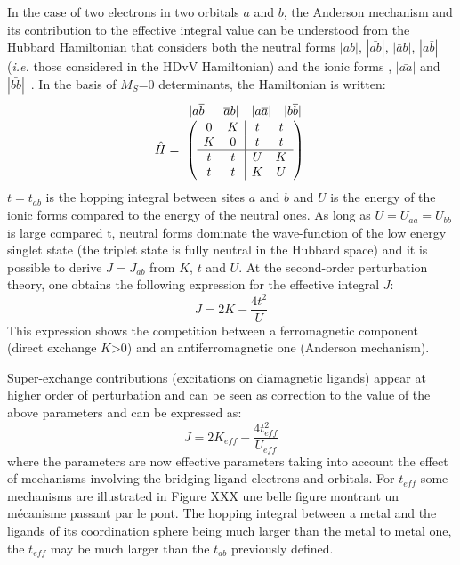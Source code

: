 \documentclass[12pt]{report}
\numberwithin{equation}{section}
\begin{document}
 In the case of two electrons in two orbitals $a$ and $b$, the Anderson mechanism and its contribution to the effective integral value can be understood from the Hubbard Hamiltonian that considers both the neutral forms $|ab|$, $|\bar{ab}|$, $|\bar{a}b|$, $|a\bar{b}|$ (\textit{i.e.} those considered in the HDvV Hamiltonian) and the ionic forms , $|\bar{aa}|$ and  $|\bar{bb}|$~\cite{malrieu_magnetic_2014}.
 In the basis of $M_S$=0 determinants, the Hamiltonian is written:
\[ \hat{H}=
\overset{
    \begin{array}{c c c c}
      |a\overline{b}| & |\overline{a}b| & |a\overline{a}| & |b\overline{b}|\\ 
    \end{array}
  }{
    \left(
  \begin{array}{ c c | c c }
  0  &  K &  t &  t\\
  K & 0 & t & t \\
  \hline
  t & t & U & K \\
  t & t & K & U 
  \end{array}
  \right)
  }
\]
 $t=t_{ab}$ is the hopping integral between sites $a$ and $b$ and $U$ is the energy of the ionic forms compared to the energy of the neutral ones.
 As long as $U=U_{aa}=U_{bb}$ is large compared t, neutral forms dominate the wave-function of the low energy singlet state (the triplet state is fully neutral in the Hubbard space) and it is possible to derive $J=J_{ab}$ from $K$, $t$ and $U$.
 At the second-order perturbation theory, one obtains the following expression for the effective integral $J$:
\begin{equation}
    J=2K-\frac{4t^2}{U}
    \label{eq:JHubb}
\end{equation}
This expression shows the competition between a ferromagnetic component (direct exchange $K$>0) and an antiferromagnetic one (Anderson mechanism).

Super-exchange contributions (excitations on diamagnetic ligands) appear at higher order of perturbation and can be seen as correction to the value of the above parameters and can be expressed as:
\begin{equation}
	J=2K_{eff}-\frac{4t_{eff}^2}{U_{eff}}
    \label{eq:JeffHubb}
\end{equation}
where the parameters are now effective parameters taking into account the effect of mechanisms involving the bridging ligand electrons and orbitals.
For $t_{eff}$ some mechanisms are illustrated in Figure XXX une belle figure montrant un mécanisme passant par le pont.
The hopping integral between a metal and the ligands of its coordination sphere being much larger than the metal to metal one, the $t_{eff}$ may be much larger than the $t_{ab}$ previously defined.
\end{document}
